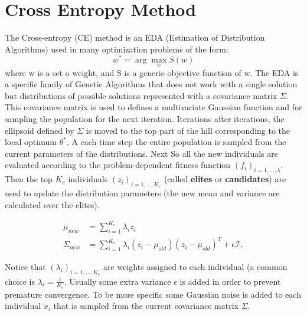 \section{Cross Entropy Method}

The Cross-entropy (CE) method is an EDA (Estimation of Distribution Algorithms) used in many optimization problems of the form:
$$w^{*}=\arg \max _{w} S(w)$$
where w is a set o weight, and S is a generic objective function of w. 
The EDA is a specific family of Genetic Algorithms that
does not work with a single solution but distributions of possible solutions represented with a covariance matrix $ \Sigma $.
This covariance matrix is used to defines a multivariate Gaussian function and for sampling the population for the next iteration.
Iterations after iterations, the ellipsoid defined by $\Sigma$ is moved to the top part of the hill corresponding to the local optimum $\theta^*$.
A each time step the entire population is sampled from the current parameters of the distributions. 
Next So all the new individuals are evaluated according to the problem-dependent fitness function $(f_i)_{i=1,...,\lambda}$.
Then the top $K_e$ individuals $(z_i)_{i=1,...,K_e}$ (called \textbf{elites} or \textbf{candidates}) are used to update the distribution parameters (the new mean and variance are calculated over the elites).

\begin{align*} 
\mu_{n e w} &=\sum_{i=1}^{K_{e}} \lambda_{i} z_{i} \\ \Sigma_{n e w} &=\sum_{i=1}^{K_{e}} \lambda_{i}\left(z_{i}-\mu_{o l d}\right)\left(z_{i}-\mu_{o l d}\right)^{T}+\epsilon \mathcal{I}, 
\end{align*}

Notice that $(\lambda_i)_{i=1,...,K_e}$ are weights assigned to each individual (a common choice is $\lambda_i = \frac{1}{K_e}$.
Usually some extra variance $\epsilon$ is added in order to prevent premature convergence.
To be more specific some Gaussian noise is added to each individual $x_i$ that is sampled from the current covariance matrix $\Sigma$.

